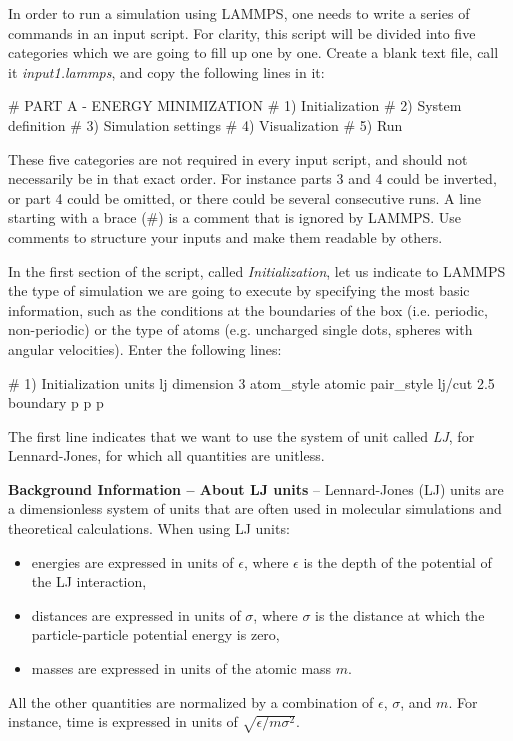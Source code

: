 In order to run a simulation using LAMMPS, one needs to
write a series of commands in an input script. For clarity,
this script will be divided into five categories which we are going to
fill up one by one. Create a blank text file, call it
\textit{input1.lammps}, and copy the following lines in it:

\begin{lcverbatim}
# PART A - ENERGY MINIMIZATION
# 1) Initialization
# 2) System definition
# 3) Simulation settings
# 4) Visualization
# 5) Run
\end{lcverbatim}

\noindent These five categories are not required in every
input script, and should not necessarily be in that
exact order. For instance parts 3 and 4 could be inverted, or
part 4 could be omitted, or there could be several
consecutive runs.
A line starting with a brace ($\#$) is a comment
that is ignored by LAMMPS. Use comments to structure 
your inputs and make them readable by others.

In the first section of the script, called \textit{Initialization},
let us indicate to LAMMPS the type of simulation we are
going to execute by specifying the most basic information,
such as the conditions at the boundaries of the box (i.e.
periodic, non-periodic) or the type of atoms (e.g. uncharged
single dots, spheres with angular velocities). Enter the
following lines:

\begin{lcverbatim}
# 1) Initialization
units lj
dimension 3
atom_style atomic
pair_style lj/cut 2.5
boundary p p p
\end{lcverbatim}

\noindent The first line indicates that we want to
use the system of unit called \textit{LJ}, for Lennard-Jones, for which all quantities
are unitless. 

\noindent \textbf{Background Information -- About LJ units} -- Lennard-Jones (LJ) units are a dimensionless system of units that are often used in molecular simulations
and theoretical calculations. When using LJ units:
\begin{itemize}
\item energies are expressed in units of $\epsilon$, where $\epsilon$ is the
  depth of the potential of the LJ interaction,
\item distances are expressed in units of $\sigma$, where $\sigma$ is the distance
  at which the particle-particle potential energy is zero,
\item masses are expressed in units of the atomic mass $m$.
\end{itemize}
All the other quantities are normalized by a combination of $\epsilon$, $\sigma$,
and $m$. For instance, time is expressed in units of $\sqrt{ \epsilon / m \sigma^2}$. 

